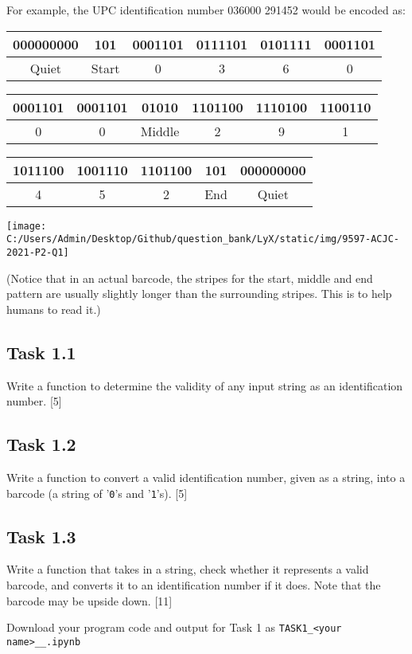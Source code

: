 \noindent For example, the UPC identification number 036000 291452
would be encoded as:

\begin{tabular}{|c|c|c|c|c|c|}
\hline 
000000000 & 101 & 0001101 & 0111101 & 0101111 & 0001101\tabularnewline
\hline 
Quiet & Start & 0 & 3  & 6  & 0\tabularnewline
\hline 
\end{tabular}

\begin{tabular}{|c|c|c|c|c|c|}
\hline 
0001101  & 0001101  & 01010 & 1101100  & 1110100  & 1100110\tabularnewline
\hline 
0  & 0  & Middle & 2  & 9  & 1\tabularnewline
\hline 
\end{tabular}

\begin{tabular}{|c|c|c|c|c|}
\hline 
1011100 & 1001110  & 1101100  & 101 & 000000000 \tabularnewline
\hline 
4  & 5  & 2  & End & Quiet\tabularnewline
\hline 
\end{tabular}
\noindent \begin{center}
\texttt{[image: C:/Users/Admin/Desktop/Github/question\_bank/LyX/static/img/9597-ACJC-2021-P2-Q1]}
\par\end{center}

\noindent (Notice that in an actual barcode, the stripes for the start,
middle and end pattern are usually slightly longer than the surrounding
stripes. This is to help humans to read it.)

\subsection*{Task 1.1}

\noindent Write a function to determine the validity of any input
string as an identification number. \hfill{}{[}5{]}

\subsection*{Task 1.2}

\noindent Write a function to convert a valid identification number,
given as a string, into a barcode (a string of '\texttt{0}'s and '\texttt{1}'s).
\hfill{}{[}5{]}

\subsection*{Task 1.3}

\noindent Write a function that takes in a string, check whether it
represents a valid barcode, and converts it to an identification number
if it does. Note that the barcode may be upside down. \hfill{}{[}11{]}

\noindent Download your program code and output for Task 1 as \texttt{TASK1\_<your
name>\_<centre number>\_<index number>.ipynb}
